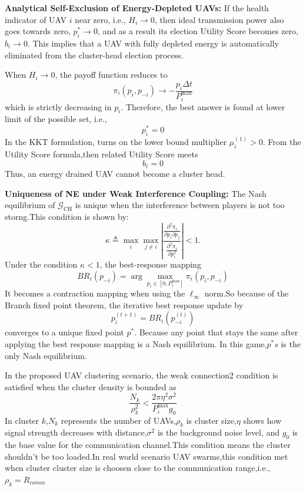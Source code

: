 \documentclass[journal]{IEEEtran}
\begin{document}
\textbf{Analytical Self-Exclusion of Energy-Depleted UAVs:}
If the health indicator of UAV $i$ near zero, i.e., $H_i\rightarrow 0$, then ideal transmission power also goes towards zero, $p_i^*\rightarrow 0$, and as a result its election Utility Score becomes zero, $b_i\rightarrow 0$. This implies that a UAV with fully depleted energy is automatically eliminated from the cluster-head election process.

When $H_i\rightarrow 0$, the payoff function reduces to
\[
\pi_i(p_i,p_{-i})
\rightarrow
-\frac{p_i\Delta t}{P_i^{\max}}
\]
which is strictly decreasing in $p_i$. Therefore, the best answer is found at lower limit of the possible set, i.e.,
\[
p_i^*=0
\]
In the KKT formulation, turns on the lower bound multiplier $\mu_i^{(1)}>0$. From the Utility Score formula,then related Utility Score meets\[
b_i=0
\]
Thus, an energy drained  UAV cannot become a cluster head.

\textbf{Uniqueness of NE under Weak Interference Coupling:}
The Nash equilibrium of $\mathcal{G}_{\mathrm{CH}}$ is unique when the interference between players is not too storng.This condition is shown by:
\begin{equation}
\label{eq:kappa}
\kappa
\triangleq
\max_i \max_{j\neq i}
\left|
\frac{
\frac{\partial^2 \pi_i}{\partial p_i \partial p_j}
}{
\frac{\partial^2 \pi_i}{\partial p_i^2}
}
\right|
<1.
\end{equation}
Under the condition $\kappa<1$, the best-response mapping
\[
BR_i(p_{-i})
=
\arg\max_{p_i\in[0,P_i^{\max}]}
\pi_i(p_i,p_{-i})
\]
It becomes a contraction mapping when using the $\ell_\infty$ norm.So because of the Branch fixed point theorem, the iterative best response update by
\[
p_i^{(t+1)}=BR_i\left(p_{-i}^{(t)}\right)
\]
converges to a unique fixed point $p^*$. Because any point that stays the same after applying the best response mapping is a Nash equilibrium. In this game,$p^*s$ is the only Nash equilibrium.

In the proposed UAV clustering scenario, the weak connection2 condition is satisfied when the cluster density is bounded as
\[
\frac{N_k}{\rho_k^2}
<
\frac{2\pi \eta^2 \sigma^2}{P_i^{\max}g_0}
\]
In cluster $k$,$N_k$ represents the number of UAVs,$\rho_k$ is cluster size,$\eta$ shows how signal strength decreases with distance,$\sigma^2$ is the background noise level, and $g_0$ is the base value for the communication channel.This condition means the cluster shouldn't be too loaded.In real world scenario UAV swarms,this condition met when cluster cluster size is choosen close to the communication range,i.e., $\rho_k=R_{comm}$
\end{document}
